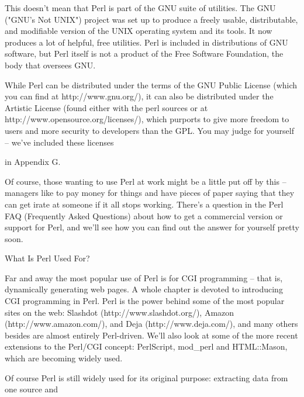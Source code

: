 \documentclass[a4paper,11pt]{book}
\begin{document}
\noindent 

\noindent This  doesn't mean that Perl is  part  of  the  GNU  suite  of utilities.  The  GNU ("GNU's  Not  UNIX") project was set up to  produce  a  freely  usable,  distributable,  and modifiable  version  of  the UNIX operating  system and  its tools.  It  now  produces  a  lot of  helpful,  free  utilities.  Perl  is  included  in distributions of GNU  software,  but Perl  itself  is  not  a  product  of  the Free  Software  Foundation,  the body that oversees  GNU.

\noindent 

\noindent While Perl can be distributed under the terms of the GNU Public License (which you can find at http://www.gnu.org/), it can also be distributed under the Artistic License (found either with the perl sources or at http://www.opensource.org/licenses/), which purports to give more freedom to users and more security to developers than the GPL. You may judge for yourself -- we've included these licenses

\noindent in Appendix G.

\noindent 

\noindent Of course, those wanting to use Perl at work might be a little put off by this -- managers like to pay money for things and have pieces of paper saying that they can get irate at someone if it all stops working. There's a question in the Perl FAQ (Frequently Asked Questions) about how to get a commercial version or support for Perl, and we'll see how you can find out the answer for yourself pretty soon.

\noindent 

\noindent What Is Perl Used For?

\noindent 

\noindent Far and away the most popular use of Perl is for CGI programming -- that is, dynamically generating web pages. A whole chapter is devoted to introducing CGI programming in Perl. Perl is the power behind some of the most popular sites on the web: Slashdot (http://www.slashdot.org/), Amazon (http://www.amazon.com/), and Deja (http://www.deja.com/), and many others besides are almost entirely Perl-driven. We'll also look at some of the more recent extensions to the Perl/CGI concept: PerlScript, mod\_perl and HTML::Mason, which are becoming widely used.

\noindent 

\noindent 

\noindent Of course Perl is still widely used for its original purpose: extracting data from one source and
\end{document}
